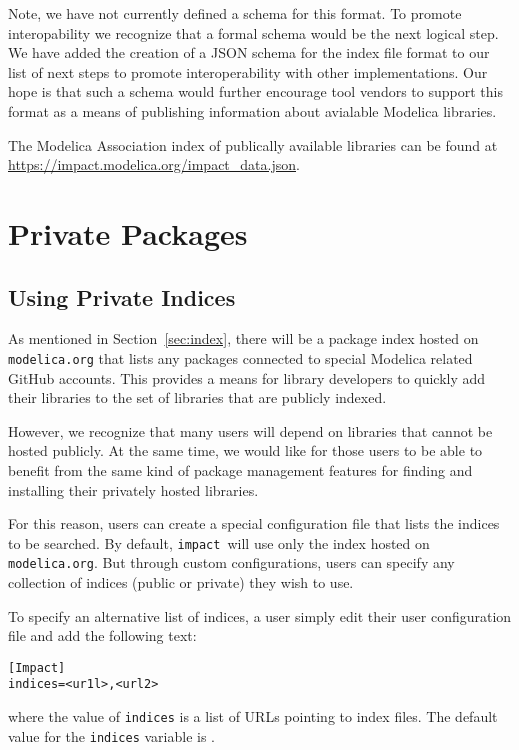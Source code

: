\documentclass[11pt,a4paper,twocolumn]{article}
\newcommand{\impact}{\texttt{impact}} %
\newcommand{\code}[1]{\texttt{#1}} %
\begin{document}
Note, we have not currently defined a schema for this format.  To
promote interopability we recognize that a formal schema would be the
next logical step.  We have added the creation of a JSON schema for
the index file format to our list of next steps to promote
interoperability with other implementations.  Our hope is that such a
schema would further encourage tool vendors to support this format as
a means of publishing information about avialable Modelica libraries.

The Modelica Association index of publically available libraries can
be found at \url{https://impact.modelica.org/impact\_data.json}.

\section{Private Packages}
\label{sec:private}

\subsection{Using Private Indices}
\label{sec:use_private}

As mentioned in Section~\ref{sec:index}, there will be a package index
hosted on \code{modelica.org} that lists any packages connected to
special Modelica related GitHub accounts.  This provides a means for
library developers to quickly add their libraries to the set of
libraries that are publicly indexed.

However, we recognize that many users will depend on libraries that
cannot be hosted publicly.  At the same time, we would like for those
users to be able to benefit from the same kind of package management
features for finding and installing their privately hosted libraries.

For this reason, users can create a special configuration file that
lists the indices to be searched.  By default, \impact\ will use only
the index hosted on \code{modelica.org}.  But through custom
configurations, users can specify any collection of indices (public or
private) they wish to use.

To specify an alternative list of indices, a user simply edit their
user configuration file and add the following text:

\begin{verbatim}
[Impact]
indices=<ur1l>,<url2>
\end{verbatim}
where the value of \code{indices} is a list of URLs pointing to index
files.  The default value for the \code{indices} variable is \code{}.
\end{document}
